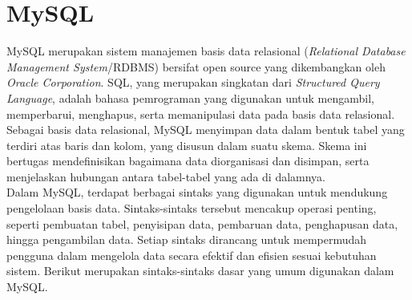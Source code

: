 \section{MySQL ~\cite{oracle:24:mysql8.4}}
\label{sec:mysql}
MySQL merupakan sistem manajemen basis data relasional (\textit{Relational Database Management System}/RDBMS) bersifat open source yang dikembangkan oleh \textit{Oracle Corporation}. SQL, yang merupakan singkatan dari \textit{Structured Query Language}, adalah bahasa pemrograman yang digunakan untuk mengambil, memperbarui, menghapus, serta memanipulasi data pada basis data relasional.
\\
Sebagai basis data relasional, MySQL menyimpan data dalam bentuk tabel yang terdiri atas baris dan kolom, yang disusun dalam suatu skema. Skema ini bertugas mendefinisikan bagaimana data diorganisasi dan disimpan, serta menjelaskan hubungan antara tabel-tabel yang ada di dalamnya.
\\
Dalam MySQL, terdapat berbagai sintaks yang digunakan untuk mendukung pengelolaan basis data. Sintaks-sintaks tersebut mencakup operasi penting, seperti pembuatan tabel, penyisipan data, pembaruan data, penghapusan data, hingga pengambilan data. Setiap sintaks dirancang untuk mempermudah pengguna dalam mengelola data secara efektif dan efisien sesuai kebutuhan sistem. Berikut merupakan sintaks-sintaks dasar yang umum digunakan dalam MySQL.
